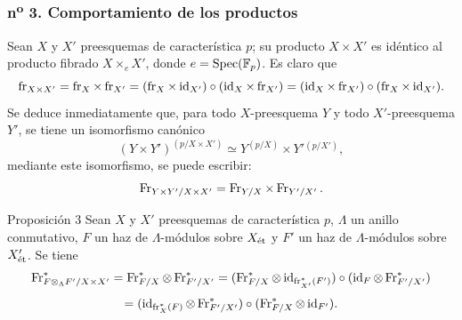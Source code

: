 \subsubsection*{n\textsuperscript{o} 3. Comportamiento de los productos}

Sean $X$ y $X'$ preesquemas de característica $p$; su producto $X\times X'$ es idéntico al producto fibrado $X\times_eX'$, donde $e=\operatorname{Spec}(\mathbb F_p)$. Es claro que
\[
\operatorname{fr}_{X\times X'}=\operatorname{fr}_X\times\operatorname{fr}_{X'}=(\operatorname{fr}_X\times\operatorname{id}_{X'})\circ(\operatorname{id}_X\times\operatorname{fr}_{X'})
=(\operatorname{id}_X\times\operatorname{fr}_{X'})\circ(\operatorname{fr}_X\times\operatorname{id}_{X'}).
\]
Se deduce inmediatamente que, para todo $X$-preesquema $Y$ y todo $X'$-preesquema $Y'$, se tiene un isomorfismo canónico
\[
(Y\times Y')^{(p/X\times X')}\simeq Y^{(p/X)}\times Y'{}^{(p/X')},
\]
mediante este isomorfismo, se puede escribir:
\[
\operatorname{Fr}_{Y\times Y'/X\times X'}=\operatorname{Fr}_{Y/X}\times\operatorname{Fr}_{Y'/X'}.
\]

\begin{statement}{Proposición 3}
Sean $X$ y $X'$ preesquemas de característica $p$, $\Lambda$ un anillo conmutativo, $F$ un haz de $\Lambda$-módulos sobre $X_{\mathrm{\acute{e}t}}$ y $F'$ un haz de $\Lambda$-módulos sobre $X'_{\mathrm{\acute{e}t}}$. Se tiene
\[
\operatorname{Fr}^*_{F\otimes_\Lambda F'/X\times X'}
=\operatorname{Fr}^*_{F/X}\otimes\operatorname{Fr}^*_{F'/X'}
=(\operatorname{Fr}^*_{F/X}\otimes\operatorname{id}_{\operatorname{fr}_{X'}^*(F')})\circ
(\operatorname{id}_F\otimes\operatorname{Fr}^*_{F'/X'})
\]
\[
=(\operatorname{id}_{\operatorname{fr}_X^*(F)}\otimes\operatorname{Fr}^*_{F'/X'})\circ
(\operatorname{Fr}^*_{F/X}\otimes\operatorname{id}_{F'}).
\]
\end{statement}
